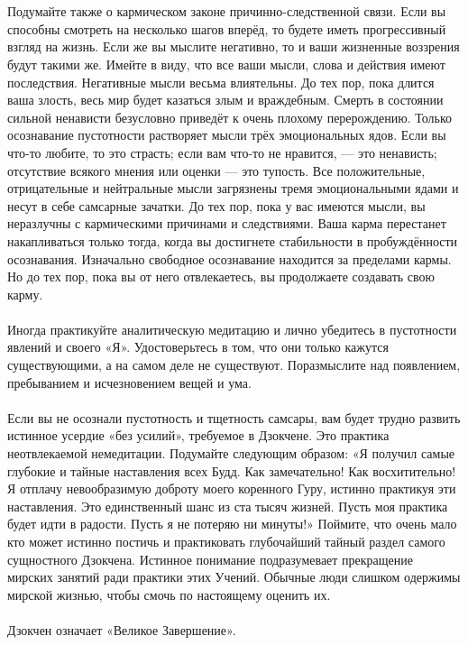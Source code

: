 \\ \\ Подумайте также о кармическом законе причинно-следствен\-ной связи. Если вы способны смотреть на несколько шагов вперёд, то будете иметь прогрессивный взгляд на жизнь. Если же вы мыслите негативно, то и ваши жизненные воззрения будут такими же. Имейте в виду, что все ваши мысли, слова и действия имеют последствия. Негативные мысли весьма влиятельны. До тех пор, пока длится ваша злость, весь мир будет казаться злым и враждебным. Смерть в состоянии сильной ненависти безусловно приведёт к очень плохому перерождению. Только осознавание пустотности растворяет мысли трёх эмоциональных ядов. Если вы что-то любите, то это страсть; если вам что-то не нравится, — это ненависть; отсутствие всякого мнения или оценки — это тупость. Все положительные, отрицательные и нейтральные мысли загрязнены тремя эмоциональными ядами и несут в себе самсарные зачатки. До тех пор, пока у вас имеются мысли, вы неразлучны с кармическими причинами и следствиями. Ваша карма перестанет накапливаться только тогда, когда вы достигнете стабильности в пробуждённости осознавания. Изначально свободное осознавание находится за пределами кармы. Но до тех пор, пока вы от него отвлекаетесь, вы продолжаете создавать свою карму.
\\ \\ Иногда практикуйте аналитическую медитацию и лично убедитесь в пустотности явлений и своего «Я». Удостоверьтесь в том, что они только кажутся существующими, а на самом деле не существуют. Поразмыслите над появлением, пребыванием и исчезновением вещей и ума.
\\ \\ Если вы не осознали пустотность и тщетность самсары, вам будет трудно развить истинное усердие «без усилий», требуемое в Дзокчене. Это практика неотвлекаемой немедитации. Подумайте следующим образом: «Я получил самые глубокие и тайные наставления всех Будд. Как замечательно! Как восхитительно! Я отплачу невообразимую доброту моего коренного Гуру, истинно практикуя эти наставления. Это единственный шанс из ста тысяч жизней. Пусть моя практика будет идти в радости. Пусть я не потеряю ни минуты!» Поймите, что очень мало кто может истинно постичь и практиковать глубочайший тайный раздел самого сущностного Дзокчена. Истинное понимание подразумевает прекращение мирских занятий ради практики этих Учений. Обычные люди слишком одержимы мирской жизнью, чтобы смочь по настоящему оце\-нить их.
\\ \\ Дзокчен означает «Великое Завершение».
